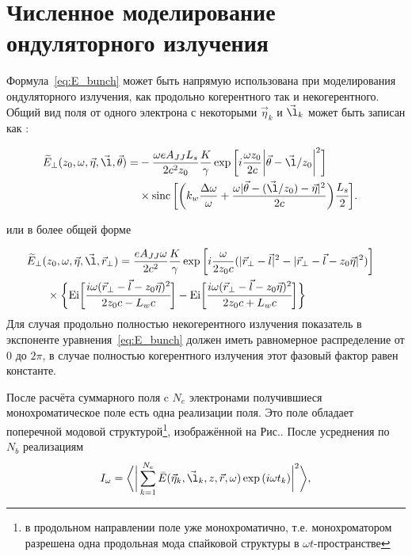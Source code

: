 \section{Численное моделирование ондуляторного излучения}
Формула~\ref{eq:E_bunch} может быть напрямую использована при моделирования ондуляторного излучения, как продольно когерентного так и некогерентного. Общий вид поля от одного электрона с некоторыми $\vec{\eta}_k$ и $\vec{\l}_k$ может быть записан как \cite{geloni_fourier_2007} : 

\begin{align}
	\widetilde{E}_{\bot}(z_0, \omega, \vec{\eta}, \vec{\l}, \vec{\theta} ) =
&	-\frac{\omega e A_{JJ} L_s}{2c^2z_0}\frac{K}{\gamma}\exp{\bigg[i \frac{\omega z_0}{2c} \bigg|\vec{\theta} - \vec{\l}/z_0\bigg|^2 \bigg]} \cr & \times \sinc \bigg[\bigg(k_w \frac{\Delta \omega}{\omega} + \frac{\omega |\vec{\theta} - (\vec{\l}/z_0) - \vec{\eta}|^2}{2c}\bigg)\cfrac{L_s}{2}\bigg].
	\label{eq:single_electron_far_field}
\end{align}

или в более общей форме

\begin{align}
	\widetilde{E}_{\bot}(&z_0, \omega, \vec{\eta}, \vec{\l}, \vec{r}_{\bot}) =
		\frac{e A_{JJ} \omega}{2 c^2}\frac{K}{\gamma} \exp{\bigg[i \frac{\omega}{2 z_0 c} (|\vec{r}_{\bot} - \vec{l}|^2 - |\vec{r}_{\bot} - \vec{l} - z_0 \vec{\eta}|^2) \bigg]} \cr & \times	\bigg \{ \text{Ei} \bigg[ \cfrac{i \omega (\vec{r}_{\bot} - \vec{l} - z_0 \vec{\eta})^2}{2z_0c - L_w c}\bigg] - \text{Ei} \bigg[ \cfrac{i \omega (\vec{r}_{\bot} - \vec{l} - z_0 \vec{\eta})^2}{2z_0c + L_w c} \bigg] \bigg\}
	\label{eq:single_electron_near_field}
\end{align}
Для случая продольно полностью некогерентного излучения показатель в экспоненте уравнения~\ref{eq:E_bunch} должен иметь равномерное распределение от $0$ до $2 \pi$, в случае полностью когерентного излучения этот фазовый фактор равен константе. 
 
После расчёта суммарного поля c $N_e$ электронами получившиеся монохроматическое поле есть одна реализации поля. Это поле обладает поперечной модовой структурой\footnote{в продольном направлении поле уже монохроматично, т.е. монохроматором разрешена одна продольная мода спайковой структуры в $\omega t$-пространстве}, изображённой на Рис.. После усреднения по $N_b$ реализациям  
\begin{align}
	I_{\omega} = \bigg \langle \bigg|\sum\limits_{k=1}^{N_e} \bar{E}(\vec{\eta}_k, \vec{\l}_k, z, \vec{r}, \omega) \exp{(i \omega t_k)}\bigg|^2 \bigg \rangle,
	\label{eq:I_MC} 
\end{align}

